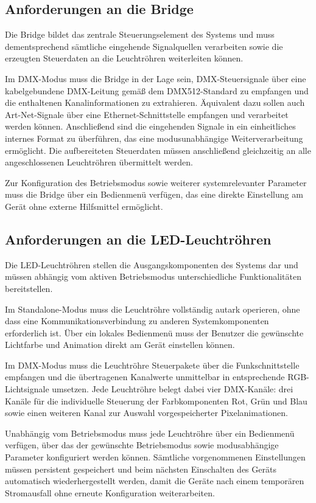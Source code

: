\subsection{Anforderungen an die Bridge}
\label{subsec:fa-bridge}

Die Bridge bildet das zentrale Steuerungselement des Systems und muss
dementsprechend sämtliche eingehende Signalquellen verarbeiten sowie
die erzeugten Steuerdaten an die Leuchtröhren weiterleiten können.

Im DMX-Modus muss die Bridge in der Lage sein,
DMX-Steuersignale über eine kabelgebundene DMX-Leitung gemäß dem DMX512-Standard
zu empfangen und die enthaltenen Kanalinformationen zu extrahieren.
Äquivalent dazu sollen auch Art-Net-Signale über eine Ethernet-Schnittstelle
empfangen und verarbeitet werden können.
Anschließend sind die eingehenden Signale in ein einheitliches internes
Format zu überführen, das eine modusunabhängige Weiterverarbeitung ermöglicht.
Die aufbereiteten Steuerdaten müssen anschließend gleichzeitig an alle
angeschlossenen Leuchtröhren übermittelt werden.

Zur Konfiguration des Betriebsmodus sowie weiterer systemrelevanter
Parameter muss die Bridge über ein Bedienmenü verfügen, das eine
direkte Einstellung am Gerät ohne externe Hilfsmittel ermöglicht.

\subsection{Anforderungen an die LED-Leuchtröhren}
\label{subsec:fa-roehre}

Die LED-Leuchtröhren stellen die Ausgangskomponenten des Systems dar und
müssen abhängig vom aktiven Betriebsmodus unterschiedliche Funktionalitäten
bereitstellen.

Im Standalone-Modus muss die Leuchtröhre vollständig autark operieren, ohne
dass eine Kommunikationsverbindung zu anderen Systemkomponenten erforderlich
ist. Über ein lokales Bedienmenü muss der Benutzer die gewünschte Lichtfarbe
und Animation direkt am Gerät einstellen können.

Im DMX-Modus muss die Leuchtröhre Steuerpakete über die
Funkschnittstelle empfangen und die übertragenen Kanalwerte unmittelbar in
entsprechende RGB-Lichtsignale umsetzen. Jede Leuchtröhre belegt dabei
vier DMX-Kanäle: drei Kanäle für die individuelle Steuerung der
Farbkomponenten Rot, Grün und Blau sowie einen weiteren Kanal zur Auswahl
vorgespeicherter Pixelanimationen.

Unabhängig vom Betriebsmodus muss jede Leuchtröhre über ein Bedienmenü
verfügen, über das der gewünschte Betriebsmodus sowie modusabhängige
Parameter konfiguriert werden können. Sämtliche vorgenommenen Einstellungen
müssen persistent gespeichert und beim nächsten Einschalten des Geräts
automatisch wiederhergestellt werden, damit die Geräte nach einem temporären
Stromausfall ohne erneute Konfiguration weiterarbeiten.

